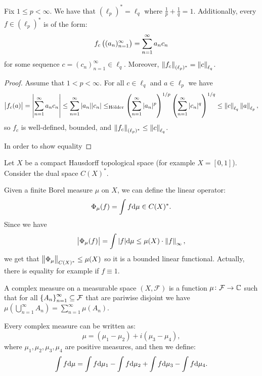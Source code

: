 \documentclass[11pt,a4paper]{article}
\begin{document}
\begin{theorem}
  Fix $1 \le p < \infty$.
  We have that $(\ell_p)^* = \ell_q$ where $\frac{1}{p} + \frac{1}{q} = 1$.
  Additionally, every $f \in (\ell_p)^*$ is of the form:
  \[
    f_c\del{(a_n)_{n=1}^{\infty}} =
    \sum_{n=1}^{\infty} a_n c_n
  \]
  for some sequence $c = (c_n)_{n=1}^{\infty} \in \ell_q$.
  Moreover, $\left\lVert f_c\right\rVert_{(\ell_p)^*} = \left\lVert c\right\rVert_{\ell_q}$.
\end{theorem}
\begin{proof}
  Assume that $1 < p < \infty$.
  For all $c \in \ell_q$ and $a \in \ell_p$ we have
  \[
    \abs{f_c(a)} =
    \abs{\sum_{n=1}^{\infty} a_n c_n} \le
    \sum_{n=1}^{\infty} |a_n| |c_n| \le_{\text{H\"older}}
    \del{\sum_{n=1}^{\infty} |a_n|^{p}}^{1/p}
    \del{\sum_{n=1}^{\infty} |c_n|^{q}}^{1/q} \le
    \norm{c}_{\ell_q} \norm{a}_{\ell_p},
  \]
  so $f_c$ is well-defined, bounded,
  and $\left\lVert f_c\right\rVert_{(\ell_p)^*} \le \left\lVert c\right\rVert_{\ell_q}$.

  In order to show equality
\end{proof}



\begin{example}
  Let $X$ be a compact Hausdorff topological space (for example $X = [0,1]$).
  Consider the dual space $C(X)^*$.

  Given a finite Borel measure $\mu$ on $X$,
  we can define the linear operator:
  \[
    \Phi_{\mu}(f) = \int f \mathrm{d} \mu \in C(X)^*.
  \]
  Since we have
  \[
    \left\lvert\Phi_{\mu}(f)\right\rvert =
    \int |f| \mathrm{d} \mu \le
    \mu(X) \cdot \left\lVert f\right\rVert_{\infty},
  \]
  we get that $\left\lVert\Phi_{\mu}\right\rVert_{C(X)^*} \le \mu(X)$ so it is a bounded
  linear functional.
  Actually, there is equality for example if $f \equiv 1$.
\end{example}

\begin{definition}
  A complex measure on a measurable space $(X,\mathcal F)$ is a function
  $\mu \colon \mathcal F \to \mathbb{C}$ such that
  for all $\left\{A_n\right\}_{n=1}^{\infty} \subseteq \mathcal F$ that are pariwise
  disjoint we have
  $\mu(\bigcup_{n=1}^{\infty} A_n) = \sum_{n=1}^{\infty} \mu(A_n)$.
\end{definition}

\begin{remark}
  Every complex measure can be written as:
  \[
    \mu = (\mu_1 - \mu_2) + i(\mu_3 - \mu_4),
  \]
  where $\mu_1,\mu_2,\mu_3,\mu_4$ are positive measures,
  and then we define:
  \[
    \int f \mathrm{d} \mu =
    \int f \mathrm{d} \mu_1 -
    \int f \mathrm{d} \mu_2 +
    \int f \mathrm{d} \mu_3 -
    \int f \mathrm{d} \mu_4.
  \]
\end{remark}
\end{document}
